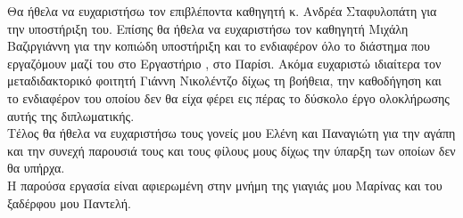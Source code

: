 \begin{acknowledgements}
Θα ήθελα να ευχαριστήσω τον επιβλέποντα καθηγητή κ. Ανδρέα Σταφυλοπάτη για την υποστήριξη του.
Επίσης θα ήθελα να ευχαριστήσω τον καθηγητή Μιχάλη Βαζιργιάννη για την κοπιώδη υποστήριξη και το ενδιαφέρον όλο το διάστημα που εργαζόμουν μαζί του στο Εργαστήριο , στο Παρίσι. 
Ακόμα ευχαριστώ ιδιαίτερα τον μεταδιδακτορικό φοιτητή Γιάννη Νικολέντζο δίχως τη βοήθεια, την καθοδήγηση και το ενδιαφέρον του οποίου δεν θα είχα φέρει εις πέρας το δύσκολο έργο ολοκλήρωσης αυτής της διπλωματικής.\\
Τέλος θα ήθελα να ευχαριστήσω τους γονείς μου Ελένη και Παναγιώτη για την αγάπη και την συνεχή παρουσιά τους και τους φίλους μους δίχως την ύπαρξη των οποίων δεν θα υπήρχα.\\
Η παρούσα εργασία είναι αφιερωμένη στην μνήμη της γιαγιάς μου Μαρίνας και του ξαδέρφου μου Παντελή.
\end{acknowledgements}

